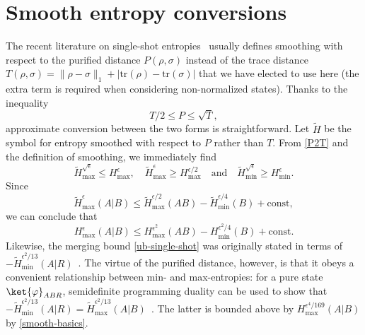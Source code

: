 \documentclass[12pt]{article}
\def\ph{\varphi}
\newcommand{\Hmax}{H_{\max}}
\newcommand{\Hmin}{H_{\min}}
\begin{document}
\section{Smooth entropy conversions} \label{smooth-ent-ineq}

The recent literature on single-shot entropies~\cite{oneshot,chain,tomamichel2010duality} usually defines smoothing with respect to the purified distance $P(\rho,\sigma)$ instead of the trace distance $T(\rho,\sigma) = \| \rho - \sigma \|_1 + |\text{tr}(\rho) - \text{tr}(\sigma)|$ that we have elected to use here (the extra term is required when considering non-normalized states). Thanks to the inequality~\cite{tomamichel2010duality}
\begin{equation} \label{P2T}
T/2 \leq P \leq \sqrt{T},
\end{equation}
approximate conversion between the two forms is straightforward. Let $\tilde H$ be the symbol for entropy smoothed with respect to $P$ rather than $T$. From \eqref{P2T} and the definition of smoothing, we immediately find
\begin{equation} \label{smooth-basics}
\tilde H_{\max}^{\sqrt{\epsilon}} \leq \Hmax^\epsilon,
\quad
\tilde H_{\max}^{\epsilon} \geq \Hmax^{\epsilon/2}
\quad \text{and} \quad
\tilde H_{\min}^{\sqrt{\epsilon}} \geq \Hmin^\epsilon.
\end{equation}
Since \cite{chain}
\begin{equation}
\tilde H_{\max}^\epsilon(A|B) \leq \tilde H_{\max}^{\epsilon/2}(AB) - \tilde H_{\min}^{\epsilon/4}(B) +\text{const},
\end{equation}
we can conclude that
\begin{equation}
\Hmax^{\epsilon}(A|B) \leq \Hmax^{\epsilon^2}(AB) - \Hmin^{\epsilon^2/4}(B) +\text{const}.
\end{equation}
Likewise, the merging bound \eqref{ub-single-shot} was originally stated in terms of $- \tilde H_{\min}^{\epsilon^2/13}(A|R)$~\cite{oneshot}. The virtue of the purified distance, however, is that it obeys a convenient relationship between min- and max-entropies: for a pure state $\ket{\ph}_{ABR}$, semidefinite programming duality can be used to show that  $-\tilde H_{\min}^{\epsilon^2/13}(A|R) = \tilde H_{\max}^{\epsilon^2/13}(A|B)$~\cite{tomamichel2010duality}. The latter is bounded above by $\Hmax^{\epsilon^4/169}(A|B)$ by \eqref{smooth-basics}.
\end{document}
